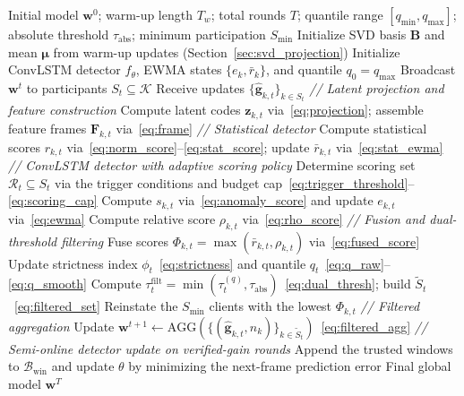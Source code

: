 \documentclass[journal]{IEEEtran}
\begin{document}
\begin{algorithm}[t]
\caption{USTAD-FL: Unsupervised Statistical Anomaly Detection at the server}
\label{alg:ustad}
\begin{algorithmic}[1]
\REQUIRE Initial model $\mathbf{w}^{0}$; warm-up length $T_w$; total rounds $T$; quantile range $[q_{\min},q_{\max}]$; absolute threshold $\tau_{\mathrm{abs}}$; minimum participation $S_{\min}$
\STATE Initialize SVD basis $\mathbf{B}$ and mean $\boldsymbol{\mu}$ from warm-up updates (Section~\ref{sec:svd_projection})
\STATE Initialize ConvLSTM detector $f_\theta$, EWMA states $\{e_{k},\bar r_{k}\}$, and quantile $q_{0}\!=\!q_{\max}$
    \STATE Broadcast $\mathbf{w}^{t}$ to participants $S_t \subseteq \mathcal{K}$
    \STATE Receive updates $\{\hat{\mathbf{g}}_{k,t}\}_{k\in S_t}$
    \STATE \textit{// Latent projection and feature construction}
    \STATE Compute latent codes $\mathbf{z}_{k,t}$ via~\eqref{eq:projection}; assemble feature frames $\mathbf{F}_{k,t}$ via~\eqref{eq:frame}
    \STATE \textit{// Statistical detector}
    \STATE Compute statistical scores $r_{k,t}$ via~\eqref{eq:norm_score}--\eqref{eq:stat_score}; update $\bar r_{k,t}$ via~\eqref{eq:stat_ewma}
    \STATE \textit{// ConvLSTM detector with adaptive scoring policy}
    \STATE Determine scoring set $\mathcal{R}_t \subseteq S_t$ via the trigger conditions and budget cap~\eqref{eq:trigger_threshold}--\eqref{eq:scoring_cap}
        \STATE Compute $s_{k,t}$ via~\eqref{eq:anomaly_score} and update $e_{k,t}$ via~\eqref{eq:ewma}
    \ENDFOR
    \STATE Compute relative score $\rho_{k,t}$ via~\eqref{eq:rho_score}
    \STATE \textit{// Fusion and dual-threshold filtering}
    \STATE Fuse scores $\Phi_{k,t} \!=\! \max(\bar r_{k,t}, \rho_{k,t})$ via~\eqref{eq:fused_score}
    \STATE Update strictness index $\phi_t$~\eqref{eq:strictness} and quantile $q_t$~\eqref{eq:q_raw}--\eqref{eq:q_smooth}
    \STATE Compute $\tau_t^{\mathrm{filt}} = \min(\tau_t^{(q)}, \tau_{\mathrm{abs}})$~\eqref{eq:dual_thresh}; build $\widetilde{S}_t$~\eqref{eq:filtered_set}
        \STATE Reinstate the $S_{\min}$ clients with the lowest $\Phi_{k,t}$
    \ENDIF
    \STATE \textit{// Filtered aggregation}
    \STATE Update $\mathbf{w}^{t+1} \!\leftarrow\! \text{AGG}(\{(\hat{\mathbf{g}}_{k,t},n_k)\}_{k\in\widetilde{S}_t})$~\eqref{eq:filtered_agg}
    \STATE \textit{// Semi-online detector update on verified-gain rounds}
        \STATE Append the trusted windows to $\mathcal{B}_{\mathrm{win}}$ and update $\theta$ by minimizing the next-frame prediction error
    \ENDIF
\ENDFOR
\RETURN Final global model $\mathbf{w}^{T}$
\end{algorithmic}
\end{algorithm}
\end{document}
